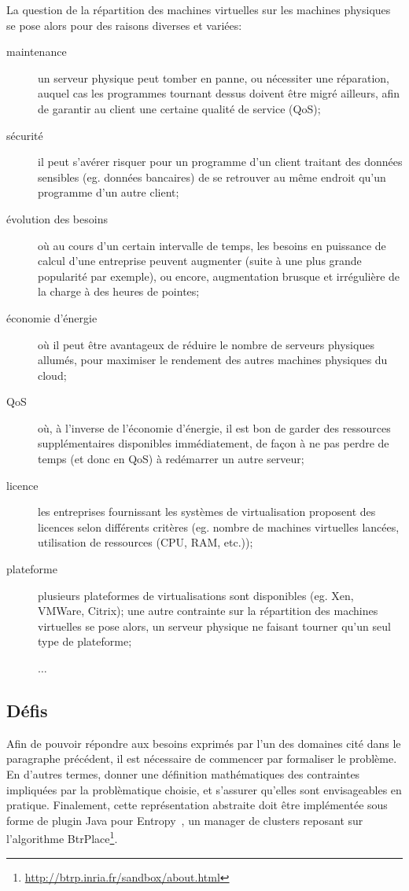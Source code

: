 \documentclass[a4paper]{article}
\begin{document}
La question de la répartition des machines virtuelles sur les machines
physiques se pose alors pour des raisons diverses et variées:
\begin{description}
	\item[maintenance] un serveur physique peut tomber en panne, ou
		nécessiter une réparation, auquel cas les programmes
		tournant dessus doivent être migré ailleurs, afin de
		garantir au client une certaine qualité de service (QoS);
	\item[sécurité] il peut s'avérer risquer pour un programme d'un
		client traitant des données sensibles (eg. données bancaires)
		de se retrouver au même endroit qu'un programme d'un
		autre client;
	\item[évolution des besoins] où au cours d'un certain intervalle de
		temps, les besoins en puissance de calcul d'une entreprise
		peuvent augmenter (suite à une plus grande popularité par
		exemple), ou encore, augmentation brusque et irrégulière
		de la charge à des heures de pointes;
	\item[économie d'énergie] où il peut être avantageux de réduire
		le nombre de serveurs physiques allumés, pour maximiser
		le rendement des autres machines physiques du cloud;
	\item[QoS] où, à l'inverse de l'économie d'énergie, il est bon
		de garder des ressources supplémentaires disponibles immédiatement,
		de façon à ne pas perdre de temps (et donc en QoS) à redémarrer
		un autre serveur;		
	\item[licence] les entreprises fournissant les systèmes de virtualisation
		proposent des licences selon différents critères (eg. nombre de
		machines virtuelles lancées, utilisation de ressources (CPU, RAM, etc.));
	\item[plateforme] plusieurs plateformes de virtualisations sont disponibles
		(eg. Xen, VMWare, Citrix); une autre contrainte sur la
		répartition des machines virtuelles se pose alors, un serveur
		physique ne faisant tourner qu'un seul type de plateforme;
	\item[] $\ldots$
\end{description}


\subsection{Défis}
Afin de pouvoir répondre aux besoins exprimés par l'un des domaines
cité dans le paragraphe précédent, il est nécessaire de commencer
par formaliser le problème. En d'autres termes, donner une définition
mathématiques des contraintes impliquées par la problèmatique choisie,
et s'assurer qu'elles sont envisageables en pratique. Finalement, cette
représentation abstraite doit être implémentée sous forme de plugin
Java pour Entropy~\cite{herm2009}, un manager de clusters reposant sur
l'algorithme BtrPlace\footnote{\url{http://btrp.inria.fr/sandbox/about.html}}.
\end{document}
